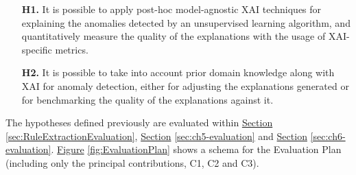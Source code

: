 \begin{itemize}
\item[\textbf{H1.}] It is possible to apply post-hoc model-agnostic XAI techniques for explaining the anomalies detected by an unsupervised learning algorithm, and quantitatively measure the quality of the explanations with the usage of XAI-specific metrics.

\item[\textbf{H2.}] It is possible to take into account prior domain knowledge along with XAI for anomaly detection, either for adjusting the explanations generated or for benchmarking the quality of the explanations against it.

\end{itemize}

The hypotheses defined previously are evaluated within \hyperref[sec:RuleExtractionEvaluation]{Section} \ref{sec:RuleExtractionEvaluation}, \hyperref[sec:ch5-evaluation]{Section} \ref{sec:ch5-evaluation} and \hyperref[sec:ch6-evaluation]{Section} \ref{sec:ch6-evaluation}. \hyperref[fig:EvaluationPlan]{Figure} \ref{fig:EvaluationPlan} shows a schema for the Evaluation Plan (including only the principal contributions, C1, C2 and C3).




